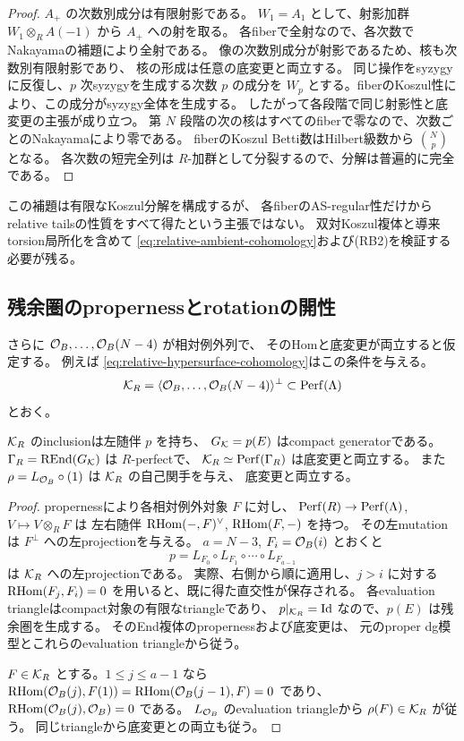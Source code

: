 \begin{proof}
 \(A_+\) の次数別成分は有限射影である。
 \(W_1=A_1\) として、射影加群 \(W_1\otimes_RA(-1)\) から \(A_+\) への射を取る。
 各fiberで全射なので、各次数でNakayamaの補題により全射である。
 像の次数別成分が射影であるため、核も次数別有限射影であり、
 核の形成は任意の底変更と両立する。
 同じ操作をsyzygyに反復し、\(p\) 次syzygyを生成する次数 \(p\) の成分を
 \(W_p\) とする。fiberのKoszul性により、この成分がsyzygy全体を生成する。
 したがって各段階で同じ射影性と底変更の主張が成り立つ。
 第 \(N\) 段階の次の核はすべてのfiberで零なので、次数ごとのNakayamaにより零である。
 fiberのKoszul Betti数はHilbert級数から \(\binom Np\) となる。
 各次数の短完全列は \(R\)-加群として分裂するので、分解は普遍的に完全である。
\end{proof}

この補題は有限なKoszul分解を構成するが、
各fiberのAS-regular性だけからrelative tailsの性質をすべて得たという主張ではない。
双対Koszul複体と導来torsion局所化を含めて
\eqref{eq:relative-ambient-cohomology}および(RB2)を検証する必要が残る。

\subsection{残余圏のpropernessとrotationの開性}

さらに \(\mathcal O_B,\ldots,\mathcal O_B(N-4)\) が相対例外列で、
そのHomと底変更が両立すると仮定する。
例えば \eqref{eq:relative-hypersurface-cohomology}はこの条件を与える。
\[
 \mathcal K_R=\langle\mathcal O_B,\ldots,\mathcal O_B(N-4)\rangle^\perp
 \subset\operatorname{Perf}(\Lambda)
\]
とおく。

\begin{proposition}\label{prop:relative-residual-proper}
 \(\mathcal K_R\) のinclusionは左随伴 \(p\) を持ち、
 \(G_{\mathcal K}=p(E)\) はcompact generatorである。
 \(\Gamma_R=\operatorname{REnd}(G_{\mathcal K})\) は \(R\)-perfectで、
 \(\mathcal K_R\simeq\operatorname{Perf}(\Gamma_R)\) は底変更と両立する。
 また \(\rho=L_{\mathcal O_B}\circ(1)\) は \(\mathcal K_R\) の自己関手を与え、
 底変更と両立する。
\end{proposition}

\begin{proof}
 propernessにより各相対例外対象 \(F\) に対し、
 \(\operatorname{Perf}(R)\to\operatorname{Perf}(\Lambda)\), \(V\mapsto V\otimes_RF\) は
 左右随伴 \(\operatorname{RHom}(-,F)^\vee\), \(\operatorname{RHom}(F,-)\) を持つ。
 その左mutationは \(F^\perp\) への左projectionを与える。
 \(a=N-3\), \(F_i=\mathcal O_B(i)\) とおくと
 \[
 p=L_{F_0}\circ L_{F_1}\circ\cdots\circ L_{F_{a-1}}
 \]
 は \(\mathcal K_R\) への左projectionである。
 実際、右側から順に適用し、\(j>i\) に対する
 \(\operatorname{RHom}(F_j,F_i)=0\) を用いると、既に得た直交性が保存される。
 各evaluation triangleはcompact対象の有限なtriangleであり、
 \(p|_{\mathcal K_R}=\operatorname{Id}\) なので、\(p(E)\) は残余圏を生成する。
 そのEnd複体のpropernessおよび底変更は、
 元のproper dg模型とこれらのevaluation triangleから従う。

 \(F\in\mathcal K_R\) とする。\(1\le j\le a-1\) なら
 \(\operatorname{RHom}(\mathcal O_B(j),F(1))=\operatorname{RHom}(\mathcal O_B(j-1),F)=0\) であり、
 \(\operatorname{RHom}(\mathcal O_B(j),\mathcal O_B)=0\) である。
 \(L_{\mathcal O_B}\) のevaluation triangleから \(\rho(F)\in\mathcal K_R\) が従う。
 同じtriangleから底変更との両立も従う。
\end{proof}

